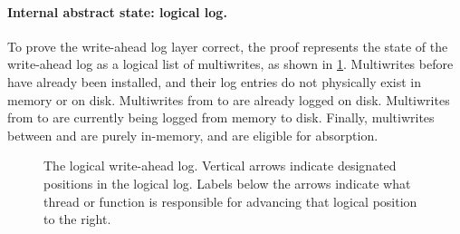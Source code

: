 


\paragraph{Internal abstract state: logical log.}
To prove the write-ahead log layer correct, the proof represents the
state of the write-ahead log as a logical list of multiwrites, as
shown in \cref{fig:log}.  Multiwrites before  have
already been installed, and their log entries do not physically exist in memory or on disk.
Multiwrites from  to  are already logged on
disk.  Multiwrites from  to  are currently being logged
from memory to disk.  Finally, multiwrites between 
and  are purely in-memory, and are eligible for absorption.

\begin{figure}[ht]
    
    \vspace{0.5 \baselineskip}
    \caption{The logical write-ahead log.  Vertical arrows indicate
        designated positions in the logical log.  Labels below the arrows
        indicate what thread or function is responsible for advancing
        that logical position to the right.}
    \label{fig:log}
\end{figure}

